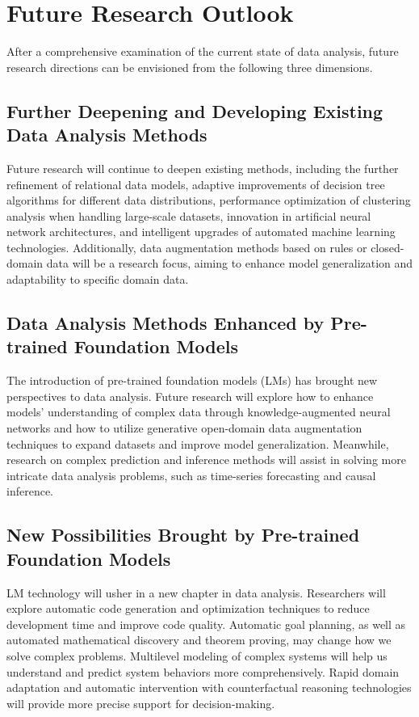   
  
  
   \section{Future Research Outlook}
  
  After a comprehensive examination of the current state of data analysis, future research directions can be envisioned from the following three dimensions.
  
  \subsection{Further Deepening and Developing Existing Data Analysis Methods}
  
  Future research will continue to deepen existing methods, including the further refinement of relational data models, adaptive improvements of decision tree algorithms for different data distributions, performance optimization of clustering analysis when handling large-scale datasets, innovation in artificial neural network architectures, and intelligent upgrades of automated machine learning technologies. Additionally, data augmentation methods based on rules or closed-domain data will be a research focus, aiming to enhance model generalization and adaptability to specific domain data.
  
  \subsection{Data Analysis Methods Enhanced by Pre-trained Foundation Models}
  
  The introduction of pre-trained foundation models (LMs) has brought new perspectives to data analysis. Future research will explore how to enhance models' understanding of complex data through knowledge-augmented neural networks and how to utilize generative open-domain data augmentation techniques to expand datasets and improve model generalization. Meanwhile, research on complex prediction and inference methods will assist in solving more intricate data analysis problems, such as time-series forecasting and causal inference.
  
  \subsection{New Possibilities Brought by Pre-trained Foundation Models}
  
  LM technology will usher in a new chapter in data analysis. Researchers will explore automatic code generation and optimization techniques to reduce development time and improve code quality. Automatic goal planning, as well as automated mathematical discovery and theorem proving, may change how we solve complex problems. Multilevel modeling of complex systems will help us understand and predict system behaviors more comprehensively. Rapid domain adaptation and automatic intervention with counterfactual reasoning technologies will provide more precise support for decision-making.
  
